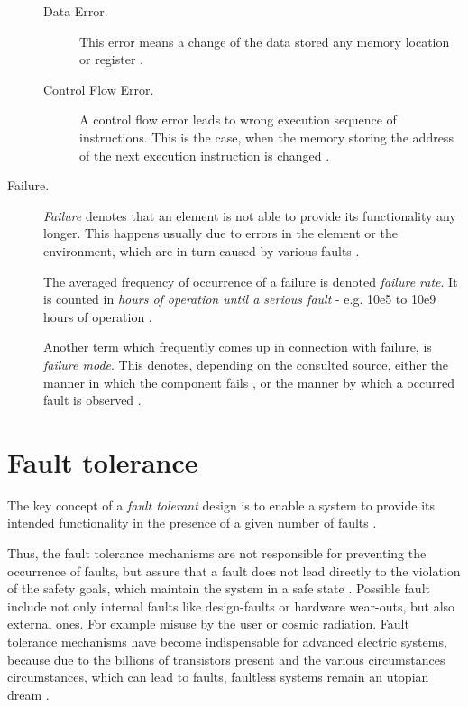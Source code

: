 \begin{description}
	\begin{description}
	\item [Data Error.]
	This error means a change of the data stored any memory location or register \cite{elattar2007}.

	\item [Control Flow Error.]
	A control flow error leads to wrong execution sequence of instructions. This is the case, when the memory storing the address of the next execution instruction is changed \cite{elattar2007}.
	\end{description}

\item [Failure.]
\emph{Failure} denotes that an element is not able to provide its functionality any longer. This happens usually due to errors in the element or the environment, which are in turn caused by various faults \cite{iso26262:1} \cite{nelson} \cite{autosar_glossary}.

The averaged frequency of occurrence of a failure is denoted \emph{failure rate}. It is counted in \emph{hours of operation until a serious fault} - e.g. 10e5 to 10e9 hours of operation \cite{rodrigues2011}.

Another term which frequently comes up in connection with failure, is \emph{failure mode}. This denotes, depending on the consulted source, either the manner in which the component fails \cite{international2006analysis}, or the manner by which a occurred fault is observed \cite{mil1980}.
\end{description}




\section{Fault tolerance}
\label{ch:fault_tolerance}

The key concept of a \emph{fault tolerant} design is to enable a system to provide its intended functionality in the presence of a given number of faults \cite{nelson}.

Thus, the fault tolerance mechanisms are not responsible for preventing the occurrence of faults, but assure that a fault does not lead directly to the violation of the safety goals, which maintain the system in a safe state \cite{iso26262:1}. Possible fault include not only internal faults like design-faults or hardware wear-outs, but also external ones. For example misuse by the user or cosmic radiation. Fault tolerance mechanisms have become indispensable for advanced electric systems, because due to the billions of transistors present and the various circumstances circumstances, which can lead to faults, faultless systems remain an utopian dream \cite{genesys}.



